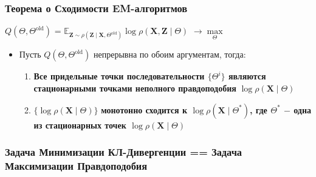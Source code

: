     \subsubsection{Теорема о Сходимости EM-алгоритмов}

        \begin{center}
            \Large
            $Q(\Theta, \Theta^{\text{old}})$ = $\mathbb{E}_{\mathbf{Z} \sim \rho(\mathbf{Z} \mid \mathbf{X}, \Theta^{\text{old}})} \log \rho(\mathbf{X}, \mathbf{Z} \mid \Theta)$ $\longrightarrow \max\limits_{\Theta}$
        \end{center}

        \begin{itemize}
            \item Пусть  $Q(\Theta, \Theta^{\text{old}})$ непрерывна по обоим аргументам, тогда:
            \begin{enumerate}
                \item \textbf{Все придельные точки последовательности $\{ \Theta^i \}$ являются стационарными точками неполного правдоподобия} $\log \rho(\mathbf{X} \mid \Theta)$
    
                \item $\{ \log \rho(\mathbf{X} \mid \Theta) \}$ \textbf{монотонно сходится к $\log \rho(\mathbf{X} \mid \Theta^*)$, где $\Theta^*$ $-$ одна из стационарных точек $\log \rho(\mathbf{X} \mid \Theta)$}
            \end{enumerate}
        \end{itemize}


    \subsubsection{Задача Минимизации КЛ-Дивергенции == Задача Максимизации Правдоподобия}

